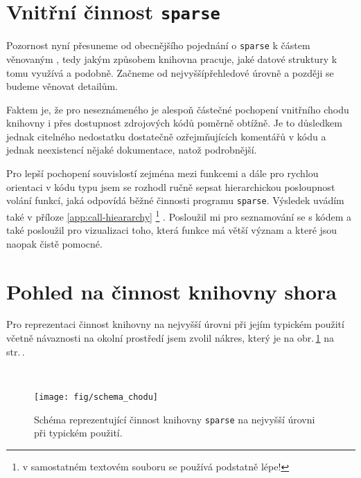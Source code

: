 \section{Vnitřní činnost \texttt{sparse}}

Pozornost nyní přesuneme od obecnějšího pojednání o \texttt{sparse}
k částem věnovaným , tedy jakým způsobem knihovna pracuje,
jaké datové struktury k tomu využívá a podobně. Začneme od nejvyšší\ndash{}přehledové
úrovně a později se budeme věnovat detailům.

Faktem je, že pro neseznámeného je alespoň částečné pochopení vnitřního
chodu knihov\-ny i přes dostupnost zdrojových kódů poměrně obtížně.
Je to důsledkem jednak citelného nedostatku dostatečně
ozřejmňujících komentářů v kódu a jednak neexistencí nějaké
dokumentace, natož podrobnější.

Pro lepší pochopení souvislostí
zejména mezi funkcemi a dále pro rychlou orientaci v kódu typu
 jsem se rozhodl ručně sepsat hierarchickou posloupnost
volání funkcí, jaká odpovídá běžné činnosti programu \texttt{sparse}.
Výsledek uvádím také v příloze \ref{app:call-hieararchy}%
%
\footnote{v samostatném textovém souboru se používá podstatně lépe!}%
%
.
Posloužil mi pro seznamování se s kódem a také posloužil
pro vizualizaci toho, která funkce má větší význam a které jsou
naopak čistě pomocné.

\section{Pohled na činnost knihovny shora}

Pro reprezentaci činnost knihovny na nejvyšší úrovni
při jejím typickém použití včetně návaznosti na okolní
prostředí jsem zvolil nákres, který je na obr.\,\ref{fig:chod} na str.\,\pageref{fig:chod}.

\hspace*{\fill}\\[-\baselineskip]
\begin{figure}[!h]
    \begin{center}
        \texttt{[image: fig/schema\_chodu]}
        \label{fig:chod}
        \caption{Schéma reprezentující činnost knihovny \texttt{sparse} na nejvyšší úrovni
                 při typickém použití.}
    \end{center}
\end{figure}

